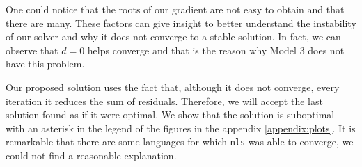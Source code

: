 One could notice that the roots of our gradient are not easy to obtain and that there are many. These factors can give insight to better understand the instability of our solver and why it does not converge to a stable solution. In fact, we can observe that $d = 0$ helps converge and that is the reason why Model 3 does not have this problem.

Our proposed solution uses the fact that, although it does not converge, every iteration it reduces the sum of residuals. Therefore, we will accept the last solution found as if it were optimal. We show that the solution is suboptimal with an asterisk in the legend of the figures in the appendix \ref{appendix:plots}. It is remarkable that there are some languages for which \verb|nls| was able to converge, we could not find a reasonable explanation.